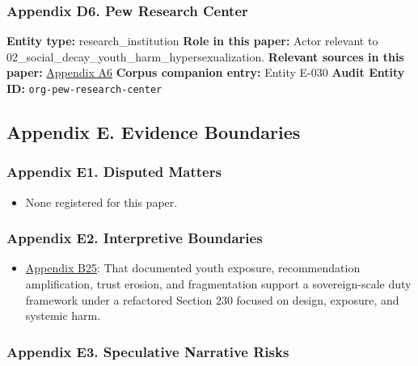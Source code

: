 \documentclass[
  american,
  11pt,
  letterpaper,
]{article}
\providecommand{\tightlist}{%
  \setlength{\itemsep}{0pt}\setlength{\parskip}{0pt}}
\begin{document}
\subsubsection{Appendix D6. Pew Research
Center}\label{ch-02-appendix-d6-pew-research-center}

\textbf{Entity type:} research\_institution \textbf{Role in this paper:}
Actor relevant to 02\_social\_decay\_youth\_harm\_hypersexualization.
\textbf{Relevant sources in this paper:}
\hyperref[ch-02-appendix-a6-social-media-seen-as-mostly-good-for-democracy-across-many-nations-but-u-s-is-a-major-outlier]{Appendix
A6} \textbf{Corpus companion entry:} Entity E-030 \textbf{Audit Entity
ID:} \texttt{org-pew-research-center}

\subsection{Appendix E. Evidence
Boundaries}\label{appendix-e.-evidence-boundaries-2}

\subsubsection{Appendix E1. Disputed
Matters}\label{ch-02-appendix-e1-disputed-matters}

\begin{itemize}
\tightlist
\item
  None registered for this paper.
\end{itemize}

\subsubsection{Appendix E2. Interpretive
Boundaries}\label{ch-02-appendix-e2-interpretive-boundaries}

\begin{itemize}
\tightlist
\item
  \hyperref[ch-02-appendix-b25-documented-youth-exposure-recommendation-amplification-trust-erosion-and-fragm]{Appendix
  B25}: That documented youth exposure, recommendation amplification,
  trust erosion, and fragmentation support a sovereign-scale duty
  framework under a refactored Section 230 focused on design, exposure,
  and systemic harm.
\end{itemize}

\subsubsection{Appendix E3. Speculative Narrative
Risks}\label{ch-02-appendix-e3-speculative-narrative-risks}
\end{document}
